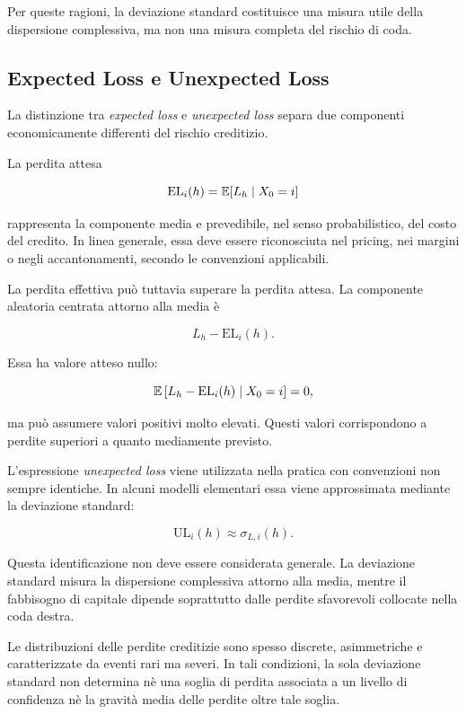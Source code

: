 Per queste ragioni, la deviazione standard costituisce una misura utile
della dispersione complessiva, ma non una misura completa del rischio
di coda.

\subsection{Expected Loss e Unexpected Loss}

\label{subsec:cap9-expected-unexpected-loss}

La distinzione tra \emph{expected loss} e \emph{unexpected loss}
separa due componenti economicamente differenti del rischio
creditizio.

La perdita attesa

\[
\mathrm{EL}_i(h)
=
\mathbb{E}[L_h\mid X_0=i]
\]

rappresenta la componente media e prevedibile, nel senso
probabilistico, del costo del credito. In linea generale, essa deve
essere riconosciuta nel pricing, nei margini o negli accantonamenti,
secondo le convenzioni applicabili.

La perdita effettiva pu\`{o} tuttavia superare la perdita attesa. La
componente aleatoria centrata attorno alla media \`{e}

\[
L_h-\mathrm{EL}_i(h).
\]

Essa ha valore atteso nullo:

\[
\mathbb{E}
\left[
L_h-\mathrm{EL}_i(h)
\mid X_0=i
\right]
=
0,
\]

ma pu\`{o} assumere valori positivi molto elevati. Questi valori
corrispondono a perdite superiori a quanto mediamente previsto.

L'espressione \emph{unexpected loss} viene utilizzata nella pratica con
convenzioni non sempre identiche. In alcuni modelli elementari essa
viene approssimata mediante la deviazione standard:

\[
\mathrm{UL}_i(h)
\approx
\sigma_{L,i}(h).
\]

Questa identificazione non deve essere considerata generale. La
deviazione standard misura la dispersione complessiva attorno alla
media, mentre il fabbisogno di capitale dipende soprattutto dalle
perdite sfavorevoli collocate nella coda destra.

Le distribuzioni delle perdite creditizie sono spesso discrete,
asimmetriche e caratterizzate da eventi rari ma severi. In tali
condizioni, la sola deviazione standard non determina n\`{e} una soglia
di perdita associata a un livello di confidenza n\`{e} la gravit\`{a}
media delle perdite oltre tale soglia.

